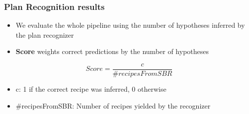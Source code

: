 \documentclass{beamer}
\begin{document}

\begin{frame}[c]\frametitle{Plan Recognition results}
   	\begin{itemize}
		\item We evaluate the whole pipeline using the number of hypotheses inferred by the plan recognizer
        \item \textbf{Score} weights correct predictions by the number of hypotheses
	\end{itemize}
	
	\begin{equation*}
        Score = \frac{c}{\#recipesFromSBR}
    \end{equation*}
    \begin{itemize}
		\item c: 1 if the correct recipe was inferred, 0 otherwise
        \item \#recipesFromSBR: Number of recipes yielded by the recognizer
    \end{itemize}
\end{frame}

\end{document}
